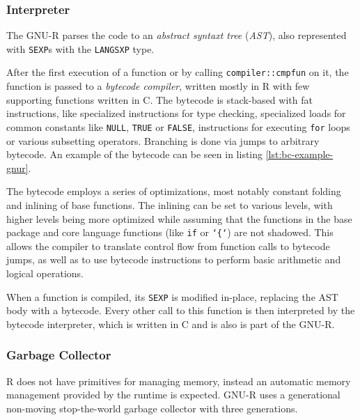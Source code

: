 \subsubsection*{Interpreter}

The GNU-R parses the code to an \textit{abstract syntaxt tree} (\textit{AST}), also represented with \texttt{SEXP}s with the \texttt{LANGSXP} type. 

After the first execution of a function or by calling \texttt{compiler::cmpfun} on it, the function is passed to a \textit{bytecode compiler}, written mostly in R with few supporting functions written in C. The bytecode is stack-based with fat instructions, like specialized instructions for type checking, specialized loads for common constants like \texttt{NULL}, \texttt{TRUE} or \texttt{FALSE}, instructions for executing \texttt{for} loops or various subsetting operators. Branching is done via jumps to arbitrary bytecode. An example of the bytecode can be seen in listing \ref{lst:bc-example-gnur}.

The bytecode employs a series of optimizations, most notably constant folding and inlining of base functions. The inlining can be set to various levels, with higher levels being more optimized while assuming that the functions in the base package and core language functions (like \texttt{if} or \texttt{`\{`}) are not shadowed. This allows the compiler to translate control flow from function calls to bytecode jumps, as well as to use bytecode instructions to perform basic arithmetic and logical operations.

When a function is compiled, its \texttt{SEXP} is modified in-place, replacing the AST body with a bytecode. Every other call to this function is then interpreted by the bytecode interpreter, which is written in C and is also is part of the GNU-R.



\subsubsection*{Garbage Collector}
R does not have primitives for managing memory, instead an automatic memory management provided by the runtime is expected. GNU-R uses a generational non-moving stop-the-world garbage collector with three generations\cite{r-gc-notes}.

